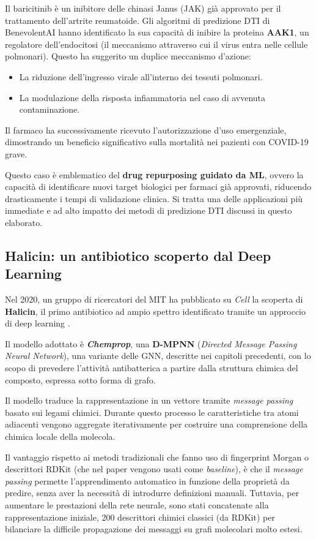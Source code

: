 Il baricitinib è un inibitore delle chinasi Janus (JAK) 
già approvato per il trattamento dell'artrite reumatoide. 
Gli algoritmi di predizione DTI di BenevolentAI hanno 
identificato la sua capacità di inibire la proteina 
\textbf{AAK1}, un regolatore dell'endocitosi (il meccanismo attraverso cui il virus entra nelle cellule 
polmonari). Questo ha suggerito un duplice meccanismo 
d'azione: 
\begin{itemize}
    \item La riduzione dell'ingresso virale all'interno dei tessuti polmonari.
    \item La modulazione della risposta infiammatoria nel caso di avvenuta contaminazione.
\end{itemize}
Il farmaco ha 
successivamente ricevuto l'autorizzazione d'uso 
emergenziale, dimostrando un beneficio significativo 
sulla mortalità nei pazienti con COVID-19 grave.

Questo caso è emblematico del \textbf{drug repurposing 
guidato da ML}, ovvero la capacità di identificare nuovi 
target biologici per farmaci già approvati, 
riducendo drasticamente i tempi di validazione 
clinica.
Si tratta una delle applicazioni più immediate 
e ad alto impatto dei metodi di predizione DTI 
discussi in questo elaborato.

\subsection{Halicin: un antibiotico scoperto dal Deep 
Learning}

Nel 2020, un gruppo di ricercatori del MIT ha pubblicato 
su \textit{Cell} la scoperta di \textbf{Halicin}, il 
primo antibiotico ad ampio spettro identificato tramite 
un approccio di deep learning 
\cite{stokesDeepLearningApproach2020}.

Il modello adottato è \textit{\textbf{Chemprop}}, una \textbf{D-MPNN} 
(\textit{Directed Message Passing Neural Network}), 
una variante delle GNN, descritte nei capitoli precedenti, con lo scopo di prevedere l'attività antibatterica 
a partire dalla struttura chimica del composto, espressa sotto forma di grafo.

Il modello traduce la rappresentazione in un vettore tramite \textit{message passing} basato sui legami chimici. Durante questo processo le caratteristiche tra atomi adiacenti vengono aggregate iterativamente per costruire una comprensione della chimica locale della molecola. 

Il vantaggio rispetto ai metodi tradizionali che fanno uso di fingerprint Morgan o descrittori RDKit (che nel paper vengono usati come \textit{baseline}), è che il \textit{message passing} permette l'apprendimento automatico in funzione della proprietà da predire, senza aver la necessità di introdurre definizioni manuali.
Tuttavia, per aumentare le prestazioni della rete neurale, sono stati concatenate alla rappresentazione iniziale, 200 descrittori chimici classici (da RDKit) per bilanciare la difficile propagazione dei messaggi su grafi molecolari molto estesi.

